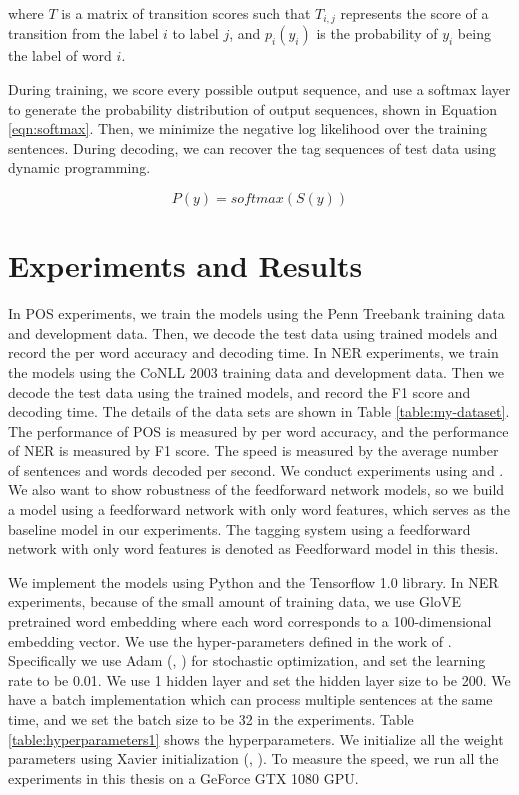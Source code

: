 where $T$ is a matrix of transition scores such that $T_{i,j}$ represents the score of a transition from the label $i$ to label $j$, and $p_{i}\left(y_{i}\right)$ is the probability of $y_{i}$ being the label of word $i$.

During training, we score every possible output sequence, and use a softmax layer to generate the probability distribution of output sequences, shown in Equation \ref{eqn:softmax}. Then, we minimize the negative log likelihood over the training sentences. During decoding, we can recover the tag sequences of test data using dynamic programming.

\begin{equation}\label{eqn:softmax}
P\left( y\right) = \textit{softmax}(S\left( y\right))
\end{equation}


\section{Experiments and Results}

In POS experiments, we train the models using the Penn Treebank training data and development data. Then, we decode the test data using trained models and record the per word accuracy and decoding time. In NER experiments, we train the models using the CoNLL 2003 training data and development data. Then we decode the test data using the trained models, and record the F1 score and decoding time. The details of the data sets are shown in Table \ref{table:my-dataset}. The performance of POS is measured by per word accuracy, and the performance of NER is measured by F1 score. The speed is measured by the average number of sentences and words decoded per second. We conduct experiments using \ffa{} and \ffb. We also want to show robustness of the feedforward network models, so we build a model using a feedforward network with only word features, which serves as the baseline model in our experiments. The tagging system using a feedforward network with only word features is denoted as Feedforward model in this thesis.

We implement the models using Python and the Tensorflow 1.0 library. In NER experiments, because of the small amount of training data, we use GloVE pretrained word embedding where each word corresponds to a 100-dimensional embedding vector. We use the hyper-parameters defined in the work of \cite{chen2014fast}. Specifically we use Adam (\citeauthor{kingma2014adam}, \citeyear{kingma2014adam}) for stochastic optimization, and set the learning rate to be 0.01. We use 1 hidden layer and set the hidden layer size to be 200. We have a batch implementation which can process multiple sentences at the same time, and we set the batch size to be 32 in the experiments. Table \ref{table:hyperparameters1} shows the hyperparameters. We initialize all the weight parameters using Xavier initialization (\citeauthor{glorot2011domain}, \citeyear{glorot2011domain}). To measure the speed, we run all the experiments in this thesis on a GeForce GTX 1080 GPU.

